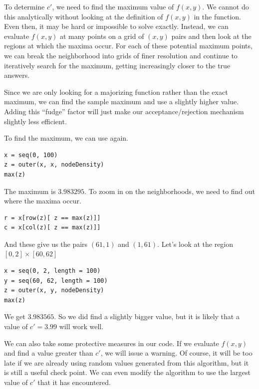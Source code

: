 To determine $c'$, we need to find the maximum value of $f(x, y)$.  We
cannot do this analytically without looking at the definition of $f(x,
y)$ in the  function. Even then, it may be hard
or impossible to solve exactly.  Instead, we can evaluate $f(x, y)$ at
many points on a grid of $(x, y)$ pairs and then look at the regions
at which the maxima occur.  For each of these potential maximum
points, we can break the neighborhood into grids of finer resolution
and continue to iteratively search for the maximum, getting
increasingly closer to the true answers.

Since we are only looking for a majorizing function rather than the
exact maximum, we can find the sample maximum and use a slightly
higher value.  Adding this ``fudge'' factor will just make our
acceptance/rejection mechanism slightly less efficient.

To find the maximum, we can use
 again.
{\footnotesize{
\begin{verbatim}
x = seq(0, 100)
z = outer(x, x, nodeDensity)
max(z)
\end{verbatim}
}}

The maximum is $ 3.983295$.
To zoom in on the neighborhoods,
we need to find out where the maxima occur.
\begin{verbatim}
r = x[row(z)[ z == max(z)]]
c = x[col(z)[ z == max(z)]]
\end{verbatim}
And these give us 
the pairs
$(61, 1)$ and $(1, 61)$.
Let's look at the region $[0, 2] \times [60, 62]$
\begin{verbatim}
x = seq(0, 2, length = 100)
y = seq(60, 62, length = 100)
z = outer(x, y, nodeDensity)
max(z)
\end{verbatim}
We get $3.983565$.  So we did find a slightly bigger value, but it is
likely that a value of $c' = 3.99$ will work well.

We can also take some protective measures in our code.  If we evaluate
$f(x, y)$ and find a value greater than $c'$, we will issue a
warning. Of course, it will be too late if we are already using random
values generated from this algorithm, but it is still a useful check
point.  We can even modify the algorithm to use the largest value of
$c'$ that it has encountered.


